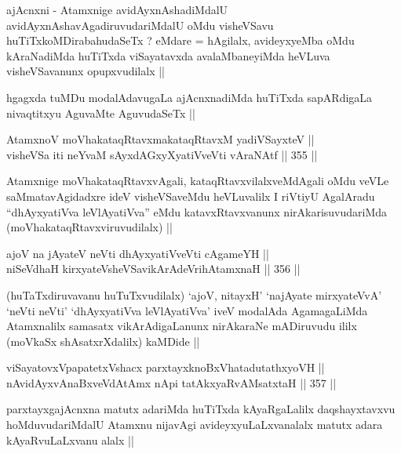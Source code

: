 \begin{artha}
ajAcnxni - Atamxnige avidAyxnAshadiMdalU
avidAyxnAshavAgadiruvudariMdalU oMdu visheVSavu
huTiTxkoMDirabahudaSeTx ? eMdare = hAgilalx, avideyxyeMba oMdu
kAraNadiMda huTiTxda viSayatavxda avalaMbaneyiMda heVLuva
visheVSavanunx opupxvudilalx ||
\end{artha}

\begin{artha}
hgagxda tuMDu modalAdavugaLa ajAcnxnadiMda huTiTxda sapARdigaLa
nivaqtitxyu AguvaMte AguvudaSeTx ||
\end{artha}


\begin{shl}
AtamxnoV moVhakataqRtavxmakataqRtavxM yadiVSayxteV || \\
visheVSa iti neYvaM sAyxdAGxyXyatiVveVti vAraNAtf ||  355 ||  
\end{shl}

\begin{artha}
Atamxnige moVhakataqRtavxvAgali, kataqRtavxvilalxveMdAgali oMdu veVLe
saMmatavAgidadxre ideV visheVSaveMdu heVLuvalilx I riVtiyU AgalAradu
``dhAyxyatiVva leVlAyatiVva'' eMdu katavxRtavxvanunx
nirAkarisuvudariMda (moVhakataqRtavxviruvudilalx) ||
\end{artha}


\begin{shl}
ajoV na jAyateV neVti dhAyxyatiVveVti cA\s \s gameYH || \\
niSeVdhaH kirxyateV\s sheVSavikArAdeVrihA\s \s tamxnaH ||  356 ||  
\end{shl}

\begin{artha}
(huTaTxdiruvavanu huTuTxvudilalx) `ajoV, nitayxH' `najAyate
  mirxyateVvA' `neVti neVti' `dhAyxyatiVva leVlAyatiVva' iveV modalAda
  AgamagaLiMda Atamxnalilx samasatx vikArAdigaLanunx nirAkaraNe
  mADiruvudu ililx (moVkaSx shAsatxrXdalilx) kaMDide ||
\end{artha}

\begin{shl}
viSayatovxVpapatetxVshacx parxtayxknoBxVhatadutathxyoVH ||  \\
nAvidAyxvAnaBxveVdAtAmx nApi tatAkxyaRvAMsatxtaH ||  357 ||  
\end{shl}

\begin{artha}
parxtayxgajAcnxna matutx adariMda huTiTxda kAyaRgaLalilx
daqshayxtavxvu hoMduvudariMdalU Atamxnu nijavAgi avideyxyuLaLxvanalalx
matutx adara kAyaRvuLaLxvanu alalx ||
\end{artha}

